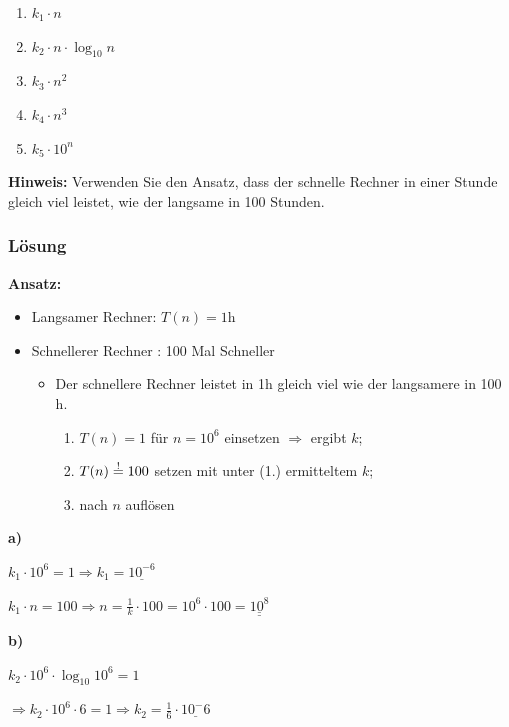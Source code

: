 \begin{enumerate}
  \item $k_1 \cdot n$
  \item $k_2 \cdot n \cdot \log_{10} n$
  \item $k_3 \cdot n^2$
  \item $k_4 \cdot n^3$
  \item $k_5 \cdot 10^n$
\end{enumerate}

\textbf{Hinweis:}
Verwenden Sie den Ansatz, dass der schnelle Rechner in einer Stunde gleich viel leistet, wie der
langsame in 100 Stunden.

\subsubsection{Lösung}

\textbf{Ansatz:}

\begin{itemize}
  \item Langsamer Rechner: $T(n) = 1 \text{h}$
  \item Schnellerer Rechner : 100 Mal Schneller
  \begin{itemize}
    \item Der schnellere Rechner leistet in 1h gleich viel wie der langsamere in 100 h.
    \begin{enumerate}
      \item $T(n) = 1$ für $n= 10^6$ einsetzen $\Rightarrow$ ergibt $k$;
      \item $T(n)\mathrel{\stackon[1pt]{$=$}{$\scriptstyle!$}} 100 $ setzen mit unter (1.) ermitteltem $k$;
      \item nach $n$ auflösen
        \end{enumerate}
  \end{itemize}
\end{itemize}

\noindent
\textbf{a)}

\medskip

$ k_1 \cdot 10^6 = 1 \Longrightarrow k_1 = \underline{10^{-6}}$

$ k_1 \cdot n = 100 \Longrightarrow n = \frac{1}{k} \cdot 100 = 10^6 \cdot 100 = \underline{\underline{10^8}}$

\noindent
\textbf{b)}
\medskip

$ k_2 \cdot 10^6\cdot \log_{10} 10^6 = 1$

$\Rightarrow k_2 \cdot 10^6 \cdot 6 = 1 \Rightarrow k_2 = \frac{1}{6} \cdot \underline{10^-6}$

